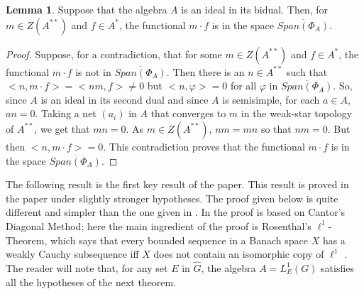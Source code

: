 \documentclass[12pt, twoside, leqno]{article}
\theoremstyle{definition}
\newtheorem{lemma}[theorem]{Lemma}
\theoremstyle{definition}
\numberwithin{equation}{section}
\begin{document}
\begin{lemma}
	Suppose that the algebra $ A $ is an ideal in its bidual.  Then, for $m\in Z(A^{**})$ and $ f\in A^{*} $, the functional $ m\cdot f $ is in the space  $\overline{Span(\Phi_{A})} $.
\end{lemma}
\begin{proof}
	Suppose, for a contradiction, that for some $ m\in Z(A^{**}) $ and $ f\in A^{*} $, the functional $ m\cdot f $ is not in $\overline{Span(\Phi_{A})}$. Then there is an $ n\in A^{**} $ such that $ <n,m\cdot f>=<nm,f>\ne 0 $ but $ <n,\varphi>=0 $ for all $ \varphi $ in $ \overline{Span(\Phi_{A})} $. So, since $ A $ is an ideal in its second dual and since $ A $ is semisimple, for each $ a\in A $, $ an=0 $. Taking a net $ (a_{i}) $ in $ A $ that converges to $ m $ in the weak-star topology of $ A^{**} $, we get that $ mn=0 $. As $ m\in Z(A^{**}) $, $ nm=mn $ so that $ nm=0 $. But then $ <n,m\cdot f>=0 $. This contradiction proves that the functional $ m\cdot f $ is in the space $\overline{Span(\Phi_{A})} $.	
\end{proof}
The following result is the first key result of the paper. This result is proved in the paper \cite {a_ulger_02} under slightly stronger hypotheses. The proof given below is quite different and simpler than the one given in \cite {a_ulger_02}. In  \cite {a_ulger_02} the proof is based on Cantor's Diagonal Method; here the main ingredient of the proof is Rosenthal's $\ell^{1}$- Theorem, which says that every bounded sequence in a Banach space $X$ has a weakly Cauchy subsequence iff $X$ does not contain an isomorphic copy of $\ell^{1}$ \cite [Chapter 11]{Diestel_01}. The reader will note that, for any set $E$ in $\hat{G}$, the algebra $A=L^{1}_{E}(G)$ satisfies all the hypotheses of the next theorem. \vspace{2mm}
\end{document}
